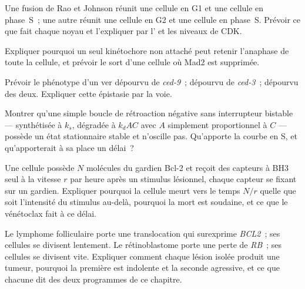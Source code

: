 \begin{exercise}[$\star\star$]\label{exo:b3:cell-cycle-apoptosis:7}
Une fusion de Rao et Johnson réunit une cellule en G1 et une cellule en
phase~S~; une autre réunit une cellule en G2 et une cellule en phase~S.
Prévoir ce que fait chaque noyau et l'expliquer par l' et les niveaux de CDK.
\end{exercise}

\begin{exercise}[$\star\star$]\label{exo:b3:cell-cycle-apoptosis:8}
Expliquer pourquoi un seul kinétochore non attaché peut retenir
l'anaphase de toute la cellule, et prévoir le sort d'une cellule où
Mad2 est supprimée.
\end{exercise}

\begin{exercise}[$\star\star$]\label{exo:b3:cell-cycle-apoptosis:9}
Prévoir le phénotype d'un ver dépourvu de \emph{ced-9}~; dépourvu de
\emph{ced-3}~; dépourvu des deux. Expliquer cette épistasie par la
voie.
\end{exercise}

\begin{exercise}[$\star\star\star$]\label{exo:b3:cell-cycle-apoptosis:10}
Montrer qu'une simple boucle de rétroaction négative sans interrupteur
bistable ---  synthétisée à $k_{s}$, dégradée à $k_{d}AC$ avec
$A$ simplement proportionnel à $C$ --- possède un état stationnaire
stable et n'oscille pas. Qu'apporte la courbe en S, et qu'apporterait à
sa place un délai~?
\end{exercise}

\begin{exercise}[$\star\star\star$]\label{exo:b3:cell-cycle-apoptosis:11}
Une cellule possède $N$ molécules du gardien Bcl-2 et reçoit des
capteurs à BH3 seul à la vitesse $r$ par heure après un stimulus
lésionnel, chaque capteur se fixant sur un gardien. Expliquer pourquoi
la cellule meurt vers le temps $N/r$ quelle que soit l'intensité du
stimulus au-delà, pourquoi la mort est soudaine, et ce que le
vénétoclax fait à ce délai.
\end{exercise}

\begin{exercise}[$\star\star\star$]\label{exo:b3:cell-cycle-apoptosis:12}
Le lymphome folliculaire porte une translocation qui surexprime
\emph{BCL2}~; ses cellules se divisent lentement. Le rétinoblastome
porte une perte de \emph{RB}~; ses cellules se divisent vite. Expliquer
comment chaque lésion isolée produit une tumeur, pourquoi la première
est indolente et la seconde agressive, et ce que chacune dit des deux
programmes de ce chapitre.
\end{exercise}

